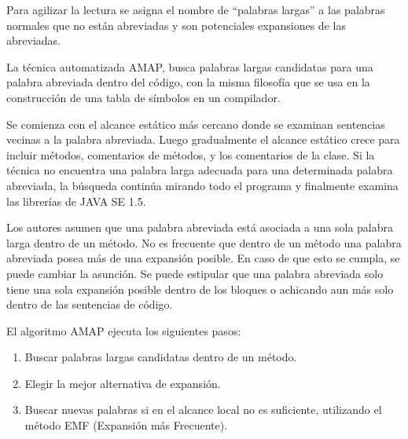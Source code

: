 Para agilizar la lectura se asigna el nombre de “palabras largas” a las palabras normales que no están abreviadas y son potenciales expansiones de las abreviadas.

La técnica automatizada AMAP, busca palabras largas candidatas para una palabra abreviada dentro del código, con la misma filosofía que se usa en la construcción de una tabla de símbolos en un compilador.

Se comienza con el alcance estático más cercano donde se examinan sentencias vecinas a la palabra abreviada. Luego gradualmente el alcance estático crece para incluir métodos, comentarios de métodos, y los comentarios de la clase. Si la técnica no encuentra una palabra larga adecuada para una determinada palabra abreviada, la búsqueda continúa mirando todo el programa y finalmente examina las librerías de JAVA SE 1.5. 

Los autores asumen que una palabra abreviada está asociada a una sola palabra larga dentro de un método. No es frecuente que dentro de un método una palabra abreviada posea más de una expansión posible. En caso de que esto se cumpla, se puede cambiar la asunción. Se puede estipular que una palabra abreviada solo tiene una sola expansión posible dentro de los bloques o achicando aun más solo dentro de las sentencias de código.


El algoritmo AMAP ejecuta los siguientes pasos:

\begin{enumerate}
\itemsep0em%
\item Buscar palabras largas candidatas dentro de un método.
\item Elegir la mejor alternativa de expansión.
\item Buscar nuevas palabras si en el alcance local no es suficiente, utilizando el método EMF (Expansión más Frecuente).
\end{enumerate}

